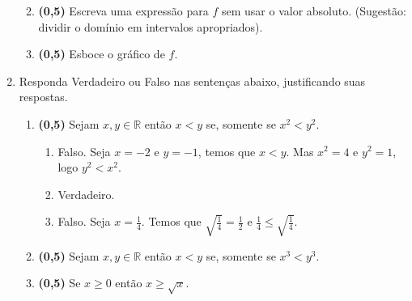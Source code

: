 \documentclass[a4paper,12pt]{article}
\newcommand{\RR}{\mathbb{R}}
\begin{document}
\begin{enumerate}
\begin{enumerate}
\begin{enumerate}
  \begin{comment}
  $
  f(x) = \left\{
  \begin{array}{rcl}
  -2x+31,& \mbox{se} & x<1\\
  1, & \mbox{se} & 1\leqx<2\\
  2x-3, & \mbox{se} & x\geq 2
  \end{array}
  \right.
  $\\
  \end{comment}
 \end{enumerate}
\item {\bf (0,5)} Escreva uma expressão para $f$ sem usar o valor absoluto. (Sugestão: dividir o domínio em intervalos apropriados).
\item  {\bf (0,5)} Esboce o gráfico de $f$.
\end{enumerate}

\vspace{5mm}
\item Responda Verdadeiro ou Falso nas sentenças abaixo, justificando suas respostas.
\begin{enumerate}

\item{\bf (0,5)} Sejam $x,y\in \RR$ então $x<y$ se, somente se $x^2<y^2$.
\begin{enumerate}
 \item Falso. Seja $x=-2$ e $y=-1$, temos que $x<y$. Mas $x^2=4$ e $y^2=1$, logo $y^2<x^2$.
 \item Verdadeiro.
 \item Falso. Seja $x=\frac{1}{4}$. Temos que $\sqrt{\frac{1}{4}}=\frac{1}{2}$ e $\frac{1}{4}\leq\sqrt{\frac{1}{4}}$.
 \end{enumerate}
\vspace{3mm}
\item{\bf (0,5)} Sejam $x,y\in \RR$ então $x<y$ se, somente se $x^3<y^3$.
\vspace{3mm}
\item{\bf (0,5)} Se $x\geq 0$ então $x\geq \sqrt{x}$. 

\end{enumerate}


\end{enumerate}
\end{document}
